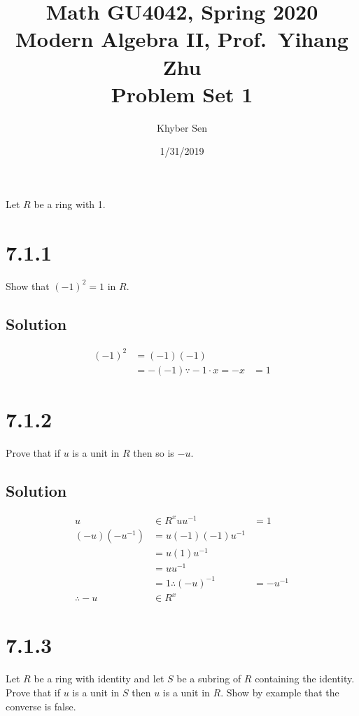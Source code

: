 \documentclass[fleqn]{article}
\title{
Math GU4042, Spring 2020 \\
Modern Algebra II, Prof.\ Yihang Zhu \\
Problem Set 1
}
\author{Khyber Sen}
\date{1/31/2019}
\begin{document}
    
    \maketitle
    
    Let $R$ be a ring with 1.
    
    \section{7.1.1}
    Show that $(-1)^2 = 1$ in $R$.
        
        \subsection{Solution}
        \begin{align}
            (-1)^2 &= (-1)(-1) \\
                &= -(-1) \because{} -1 \cdot x = -x
                &= 1
        \end{align}
    
    \section{7.1.2}
    Prove that if $u$ is a unit in $R$ then so is $-u$.
        
        \subsection{Solution}
        \begin{align}
            u &\in R^x
            u u^{-1} &= 1 \\
            (-u)(-u^{-1}) &= u (-1)(-1) u^{-1} \\
                &= u (1) u^{-1} \\
                &= u u^{-1} \\
                &= 1
            \therefore{} (-u)^{-1} &= -u^{-1} \\
            \therefore{} -u &\in R^x
        \end{align}
    
    \section{7.1.3}
    Let $R$ be a ring with identity and let $S$ be a subring of $R$ containing the identity.  Prove that if $u$ is a unit in $S$ then $u$ is a unit in $R$.  Show by example that the converse is false.
        
\end{document}
